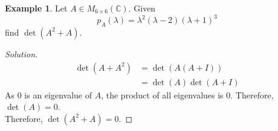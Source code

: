 \documentclass[fleqn, a4paper, 12pt]{article}
\theoremstyle{definition}
\newtheorem{example}{Example} %
\theoremstyle{theorem}
\theoremstyle{remark}
\newenvironment{solution} %
	{\begin{proof}[Solution]\let\qed\relax}
	{\end{proof}}
\numberwithin{corollary}{theorem}
\numberwithin{equation}{theorem}
\begin{document}
\begin{example}
	Let $A \in M_{6 \times 6} (\mathbb{C})$. Given
	\begin{equation*}
		p_A(\lambda) = \lambda^2 (\lambda - 2) (\lambda + 1)^3
	\end{equation*}
	find $\det(A^2 + A)$.
\end{example}

\begin{solution}
	\begin{align*}
		\det(A + A^2) &= \det(A (A + I))\\
		&= \det(A) \det(A + I)
	\end{align*}
	As $0$ is an eigenvalue of $A$, the product of all eigenvalues is $0$. Therefore, $\det(A) = 0$.\\
	Therefore, $\det(A^2 + A) = 0$.
\end{solution}
\end{document}
